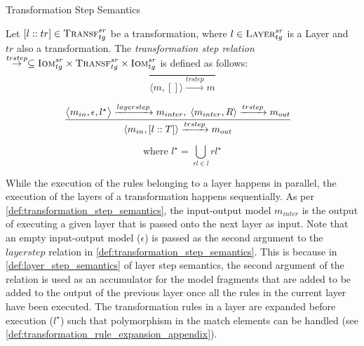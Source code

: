 \begin{definition} {Transformation Step Semantics}
\label{def:transformation_step_semantics}

Let $[l::tr]\in \textsc{Transf}^{sr}_{tg}$ be a transformation, where $l\in
\textsc{Layer}^{sr}_{tg}$ is a Layer and $tr$ also a transformation. The \emph{transformation step relation}
$\stackrel{trstep}{\rightarrow}\subseteq \textsc{Iom}^{sr}_{tg}\times \textsc{Transf}^{sr}_{tg}\times
\textsc{Iom}^{sr}_{tg}$ is defined as follows: 
$$\frac{}{\langle m,[]\rangle \xrightarrow{trstep} m}$$

$$\frac{\big\langle m_{in},\epsilon,l^{\star}\big\rangle \xrightarrow{layerstep} m_{inter},\; \langle m_{inter},R\rangle \xrightarrow{trstep} m_{out}}{\langle m_{in},[l::T]\rangle \xrightarrow{trstep} m_{out}} \hspace{.3cm}$$

$$\text{where } l^{\star}=\bigcup_{rl\in l}rl^{\star}$$
\end{definition}

While the execution of the rules belonging to a layer happens in parallel, the execution of the layers of a transformation happens sequentially. As per \cref{def:transformation_step_semantics}, the input-output model $m_{inter}$ is the output of executing a given layer that is passed onto the next layer as input. Note that an empty input-output model ($\epsilon$) is passed as the second argument to the $layerstep$ relation in \cref{def:transformation_step_semantics}. This is because in \cref{def:layer_step_semantics} of layer step semantics, the second argument of the relation is used as an accumulator for the model fragments that are added to be added to the output of the previous layer once all the rules in the current layer have been executed. The transformation rules in a layer are expanded before execution ($l^{\star}$) such that polymorphism in the match elements can be handled (see \cref{def:transformation_rule_expansion_appendix}). 



